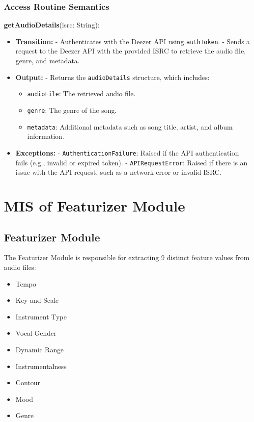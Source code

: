 \documentclass[12pt, titlepage]{article}
\begin{document}
\subsubsection{Access Routine Semantics}

\noindent \textbf{getAudioDetails}(isrc: String):
\begin{itemize}
\item \textbf{Transition:} 
    - Authenticates with the Deezer API using \texttt{authToken}.
    - Sends a request to the Deezer API with the provided ISRC to retrieve the audio file, genre, and metadata.
\item \textbf{Output:} 
    - Returns the \texttt{audioDetails} structure, which includes:
      \begin{itemize}
        \item \texttt{audioFile}: The retrieved audio file.
        \item \texttt{genre}: The genre of the song.
        \item \texttt{metadata}: Additional metadata such as song title, artist, and album information.
      \end{itemize}
\item \textbf{Exceptions:} 
    - \texttt{AuthenticationFailure}: Raised if the API authentication fails (e.g., invalid or expired token).
    - \texttt{APIRequestError}: Raised if there is an issue with the API request, such as a network error or invalid ISRC.
\end{itemize}

\section{MIS of Featurizer Module}

\subsection{Featurizer Module}
The Featurizer Module is responsible for extracting 9 distinct feature values from audio files:
\begin{itemize}
    \item Tempo
    \item Key and Scale
    \item Instrument Type
    \item Vocal Gender
    \item Dynamic Range
    \item Instrumentalness
    \item Contour
    \item Mood
    \item Genre
\end{itemize}
\end{document}
